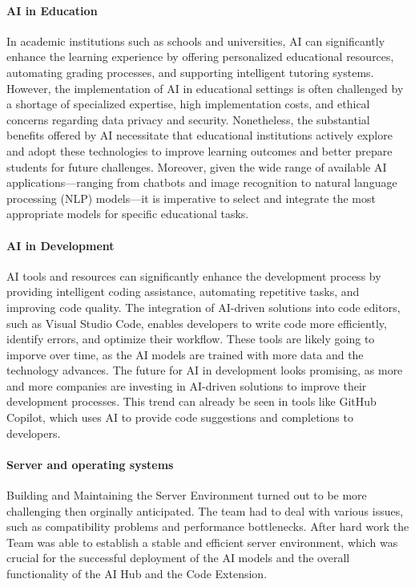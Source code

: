 \paragraph{AI in Education}

In academic institutions such as schools and universities, AI can significantly enhance the learning experience by offering personalized educational resources, 
automating grading processes, and supporting intelligent tutoring systems. However, the implementation of AI in educational settings is often challenged by a shortage of 
specialized expertise, high implementation costs, and ethical concerns regarding data privacy and security. Nonetheless, 
the substantial benefits offered by AI necessitate that educational institutions actively explore and adopt these technologies 
to improve learning outcomes and better prepare students for future challenges. Moreover, given the wide range of available AI applications—ranging from chatbots and image 
recognition to natural language processing (NLP) models—it is imperative to select and integrate the most appropriate models for specific educational tasks.

\paragraph{AI in Development}
\label{par:AI-in-Development}

AI tools and resources can significantly enhance the development process by providing intelligent coding assistance, automating repetitive tasks, and improving code quality.
The integration of AI-driven solutions into code editors, such as Visual Studio Code, enables developers to write code more efficiently, identify errors, and optimize their workflow.
These tools are likely going to imporve over time, as the AI models are trained with more data and the technology advances. 
The future for AI in development looks promising, as more and more companies are investing in AI-driven solutions to improve their development processes.
This trend can already be seen in tools like GitHub Copilot, which uses AI to provide code suggestions and completions to developers.

\paragraph{Server and operating systems}

Building and Maintaining the Server Environment turned out to be more challenging then orginally anticipated. The team had to deal with various issues, such as compatibility problems and performance bottlenecks.
After hard work the Team was able to establish a stable and efficient server environment, which was crucial for the successful deployment of the AI models and the overall functionality of the AI Hub and the Code Extension.


